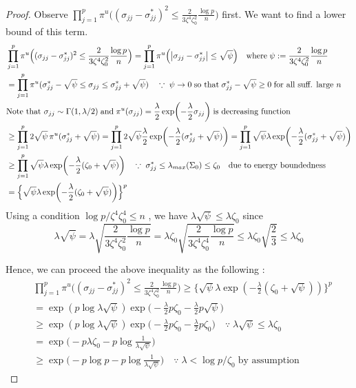 \begin{proof}
    Observe $\prod_{j=1}^p \pi^u\Big((\sigma_{jj}- \sigma_{jj}^*)^2 \leq \frac{2}{3\zeta^4 \zeta_0^2}\frac{\log p}{n} \Big)$ first. We want to find a lower bound of this term.
    \begin{align*}
        &\prod_{j=1}^p \pi^u\Big((\sigma_{jj}- \sigma_{jj}^*)^2 \leq \frac{2}{3\zeta^4 \zeta_0^2}\frac{\log p}{n} \Big) = \prod_{j=1}^p \pi^u\Big(\abs{\sigma_{jj}- \sigma_{jj}^*} \leq \sqrt\psi \Big) \quad \text{where} \; \psi:= \frac{2}{3\zeta^4 \zeta_0^2}\frac{\log p}{n} \\
        &= \prod_{j=1}^p \pi^u(\sigma_{jj}^* -\sqrt \psi \leq \sigma_{jj}\leq \sigma_{jj}^* + \sqrt \psi ) \quad \because \; \psi \rightarrow 0 \; \text{so that}\; \sigma_{jj}^* - \sqrt \psi \geq 0 \; \text{for all suff. large } n \\ 
        &\text{Note that } \sigma_{jj}\sim \Gamma(1, \lambda/2)\; \text{and}\; \pi^u(\sigma_{jj}) = \frac{\lambda}{2}\exp(-\frac{\lambda}{2}\sigma_{jj}) \; \text{is decreasing function } \\
        &\geq \prod_{j=1}^p 2\sqrt\psi \,  \pi^u(\sigma_{jj}^* + \sqrt \psi) = \prod_{j=1}^p 2\sqrt\psi \frac \lambda 2 \exp(-\frac \lambda 2 (\sigma_{jj}^* + \sqrt \psi )) = \prod_{j=1}^p \sqrt\psi \lambda  \exp(-\frac \lambda 2 (\sigma_{jj}^* + \sqrt \psi )) \\
        &\geq \prod_{j=1}^p \sqrt\psi \lambda  \exp(-\frac \lambda 2 (\zeta_0 + \sqrt \psi )) \quad \because \; \sigma_{jj}^* \leq \lambda_{max}(\Sigma_0)\leq \zeta_0 \quad \text{due to energy boundedness} \\
        &= \Big\{\sqrt\psi \lambda  \exp(-\frac \lambda 2 (\zeta_0 + \sqrt \psi ))  \Big\}^p
    \end{align*}
    Using a condition $\log p/\zeta^4 \zeta_0^4 \leq n$ , we have $\lambda\sqrt \psi \leq \lambda \zeta_0$ since \[\lambda \sqrt{\psi} = \lambda \sqrt{\frac{2}{3\zeta^4 \zeta_0^2}\frac{\log p}{n}} = \lambda \zeta_0 \sqrt{\frac{2}{3\zeta^4 \zeta_0^4}\frac{\log p}{n}} \leq \lambda \zeta_0 \sqrt{\frac 23}\leq \lambda \zeta_0\]

    Hence, we can proceed the above inequality as the following :
    \begin{align*}
        &\prod_{j=1}^p \pi^u\Big((\sigma_{jj}- \sigma_{jj}^*)^2 \leq \frac{2}{3\zeta^4 \zeta_0^2}\frac{\log p}{n} \Big) \geq \Big\{\sqrt\psi \lambda  \exp(-\frac \lambda 2 (\zeta_0 + \sqrt \psi ))  \Big\}^p \\
        &= \exp(p\log \lambda \sqrt \psi)\exp\Big(- \frac \lambda 2 p \zeta_0 - \frac \lambda 2 p \sqrt \psi \Big) \\
        &\geq \exp(p\log \lambda \sqrt \psi)\exp\Big(- \frac \lambda 2 p \zeta_0 - \frac \lambda 2 p \zeta_0 \Big)  \quad \because \; \lambda\sqrt \psi \leq \lambda \zeta_0 \\
        &= \exp\Big(- p\lambda \zeta_0 - p \log \frac{1}{\lambda\sqrt{\psi}}\Big) \\
        &\geq \exp\Big(-p \log p - p \log \frac{1}{\lambda\sqrt{\psi}} \Big) \quad \because \; \lambda < \log p / \zeta_0 \; \text{by assumption}
    \end{align*}


\end{proof}
